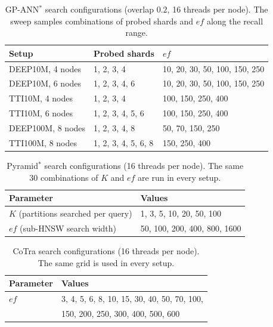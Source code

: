 
\begin{table}[t]
\centering
\small
\caption{GP-ANN$^*$ search configurations (overlap $0.2$, 16 threads per node). The sweep samples combinations of probed shards and $ef$ along the recall range.}
\label{tab:gpann-config}
\begin{tabular}{lll}
\toprule
\textbf{Setup} & \textbf{Probed shards} & \textbf{$ef$} \\
\midrule
DEEP10M, 4 nodes  & 1, 2, 3, 4          & 10, 20, 30, 50, 100, 150, 250 \\
DEEP10M, 6 nodes  & 1, 2, 3, 4, 6       & 10, 20, 30, 50, 100, 150, 250 \\
TTI10M, 4 nodes   & 1, 2, 3, 4          & 100, 150, 250, 400 \\
TTI10M, 6 nodes   & 1, 2, 3, 4, 5, 6    & 100, 150, 250, 400 \\
DEEP100M, 8 nodes & 1, 2, 3, 4, 8       & 50, 70, 150, 250 \\
TTI100M, 8 nodes  & 1, 2, 3, 4, 5, 6, 8 & 150, 250, 400 \\
\bottomrule
\end{tabular}
\end{table}

\begin{table}[t]
\centering
\small
\caption{Pyramid$^*$ search configurations (16 threads per node). The same 30 combinations of $K$ and $ef$ are run in every setup.}
\label{tab:pyramid-config}
\begin{tabular}{ll}
\toprule
\textbf{Parameter} & \textbf{Values} \\
\midrule
$K$ (partitions searched per query) & 1, 3, 5, 10, 20, 50, 100 \\
$ef$ (sub-HNSW search width)       & 50, 100, 200, 400, 800, 1600 \\
\bottomrule
\end{tabular}
\end{table}

\begin{table}[t]
\centering
\small
\caption{CoTra search configurations (16 threads per node). The same grid is used in every setup.}
\label{tab:cotra-config}
\begin{tabular}{ll}
\toprule
\textbf{Parameter} & \textbf{Values} \\
\midrule
$ef$ & 3, 4, 5, 6, 8, 10, 15, 30, 40, 50, 70, 100, \\
     & 150, 200, 250, 300, 400, 500, 600 \\
\bottomrule
\end{tabular}
\end{table}

